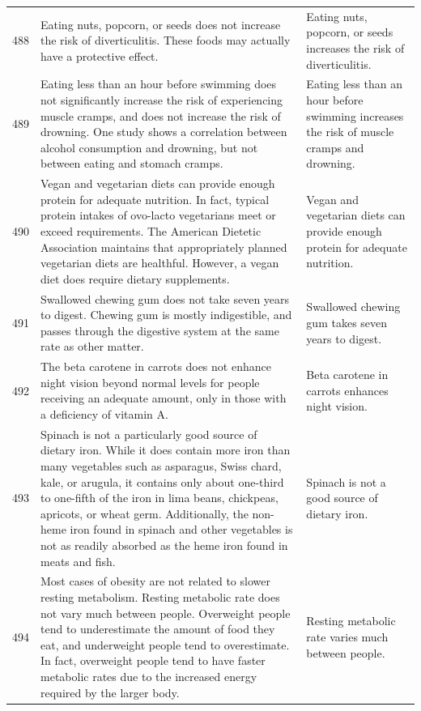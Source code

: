 \begin{tabular}{c|p{}|p{}}
488 & Eating nuts, popcorn, or seeds does not increase the risk of diverticulitis. These foods may actually have a protective effect. & Eating nuts, popcorn, or seeds increases the risk of diverticulitis. \\
489 & Eating less than an hour before swimming does not significantly increase the risk of experiencing muscle cramps, and does not increase the risk of drowning. One study shows a correlation between alcohol consumption and drowning, but not between eating and stomach cramps. & Eating less than an hour before swimming increases the risk of muscle cramps and drowning. \\
490 & Vegan and vegetarian diets can provide enough protein for adequate nutrition. In fact, typical protein intakes of ovo-lacto vegetarians meet or exceed requirements. The American Dietetic Association maintains that appropriately planned vegetarian diets are healthful. However, a vegan diet does require dietary supplements. & Vegan and vegetarian diets can provide enough protein for adequate nutrition. \\
491 & Swallowed chewing gum does not take seven years to digest. Chewing gum is mostly indigestible, and passes through the digestive system at the same rate as other matter. & Swallowed chewing gum takes seven years to digest. \\
492 & The beta carotene in carrots does not enhance night vision beyond normal levels for people receiving an adequate amount, only in those with a deficiency of vitamin A. & Beta carotene in carrots enhances night vision. \\
493 & Spinach is not a particularly good source of dietary iron. While it does contain more iron than many vegetables such as asparagus, Swiss chard, kale, or arugula, it contains only about one-third to one-fifth of the iron in lima beans, chickpeas, apricots, or wheat germ. Additionally, the non-heme iron found in spinach and other vegetables is not as readily absorbed as the heme iron found in meats and fish. & Spinach is not a good source of dietary iron. \\
494 & Most cases of obesity are not related to slower resting metabolism. Resting metabolic rate does not vary much between people. Overweight people tend to underestimate the amount of food they eat, and underweight people tend to overestimate. In fact, overweight people tend to have faster metabolic rates due to the increased energy required by the larger body. & Resting metabolic rate varies much between people. \\

\end{tabular}
